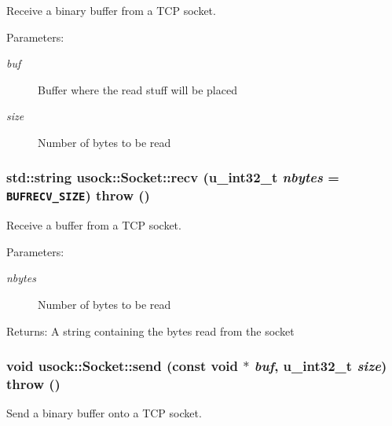 Receive a binary buffer from a TCP socket. 

\begin{Desc}
\item[Parameters:]
\begin{description}
\item[{\em buf}]Buffer where the read stuff will be placed \item[{\em size}]Number of bytes to be read \end{description}
\end{Desc}
\hypertarget{classusock_1_1Socket_be79db8987d9d0dd3a534fca7a84f0f9}{
\subsubsection[{recv}]{\setlength{\rightskip}{0pt plus 5cm}std::string usock::Socket::recv (u\_\-int32\_\-t {\em nbytes} = {\tt BUFRECV\_\-SIZE})  throw ()}}
\label{classusock_1_1Socket_be79db8987d9d0dd3a534fca7a84f0f9}


Receive a buffer from a TCP socket. 

\begin{Desc}
\item[Parameters:]
\begin{description}
\item[{\em nbytes}]Number of bytes to be read \end{description}
\end{Desc}
\begin{Desc}
\item[Returns:]A string containing the bytes read from the socket \end{Desc}
\hypertarget{classusock_1_1Socket_a42fa11f66d5f75f37c67f3a31d1ea81}{
\subsubsection[{send}]{\setlength{\rightskip}{0pt plus 5cm}void usock::Socket::send (const void $\ast$ {\em buf}, \/  u\_\-int32\_\-t {\em size})  throw ()}}
\label{classusock_1_1Socket_a42fa11f66d5f75f37c67f3a31d1ea81}


Send a binary buffer onto a TCP socket. 

